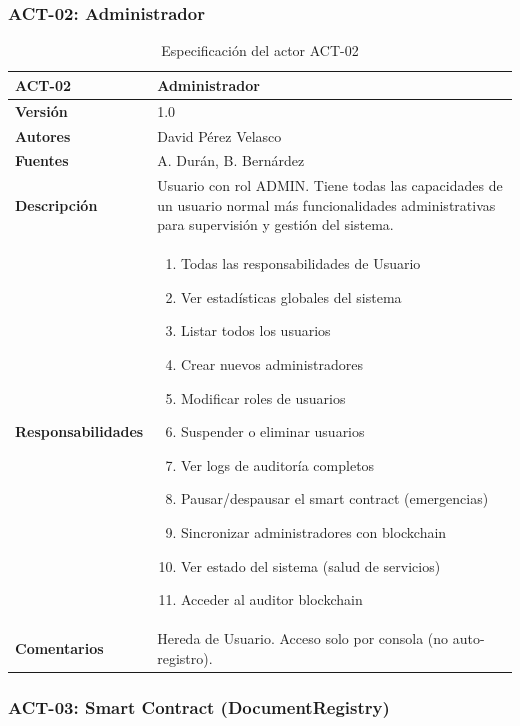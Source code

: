 \documentclass[11pt, a4paper]{article}
\begin{document}
\subsubsection{ACT-02: Administrador}

\begin{table}[H]
    \centering
    \small
    \begin{tabular}{|p{4cm}|p{10cm}|}
    \hline
    \textbf{ACT-02} & Administrador \\
    \hline
    \textbf{Versión} & 1.0 \\
    \hline
    \textbf{Autores} & David Pérez Velasco \\
    \hline
    \textbf{Fuentes} & A. Durán, B. Bernárdez \\
    \hline
    \textbf{Descripción} & Usuario con rol ADMIN. Tiene todas las capacidades de un usuario normal más funcionalidades administrativas para supervisión y gestión del sistema. \\
    \hline
    \textbf{Responsabilidades} & 
    \begin{enumerate}
        \item Todas las responsabilidades de Usuario
        \item Ver estadísticas globales del sistema
        \item Listar todos los usuarios
        \item Crear nuevos administradores
        \item Modificar roles de usuarios
        \item Suspender o eliminar usuarios
        \item Ver logs de auditoría completos
        \item Pausar/despausar el smart contract (emergencias)
        \item Sincronizar administradores con blockchain
        \item Ver estado del sistema (salud de servicios)
        \item Acceder al auditor blockchain
    \end{enumerate} \\
    \hline
    \textbf{Comentarios} & Hereda de Usuario. Acceso solo por consola (no auto-registro). \\
    \hline
    \end{tabular}
    \caption{Especificación del actor ACT-02}
\end{table}

\subsubsection{ACT-03: Smart Contract (DocumentRegistry)}
\end{document}
